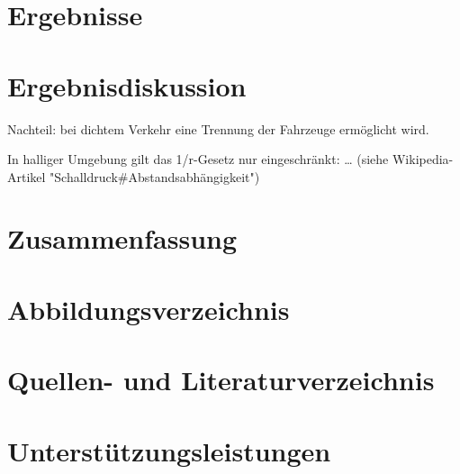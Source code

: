 \documentclass[12pt, a4paper]{article}
\begin{document}
\section{Ergebnisse}

\section{Ergebnisdiskussion}

Nachteil: bei dichtem Verkehr eine Trennung der Fahrzeuge ermöglicht wird.

In halliger Umgebung gilt das 1/r-Gesetz nur eingeschränkt: \dots
(siehe Wikipedia-Artikel "Schalldruck\#Abstandsabhängigkeit")

\section{Zusammenfassung}

\newpage

\section{Abbildungsverzeichnis}
\listoffigures

\section{Quellen- und Literaturverzeichnis}

\printbibliography

\section{Unterstützungsleistungen}
\end{document}

